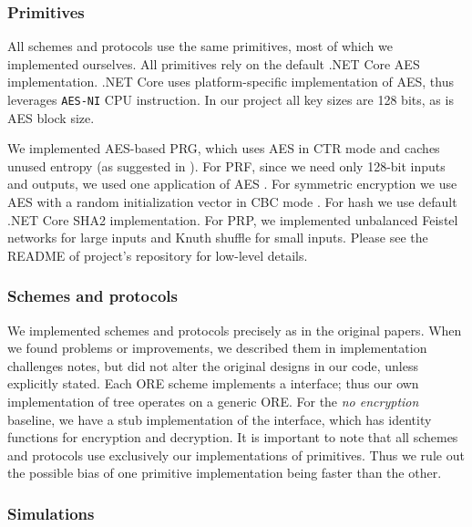 		\subsubsection{Primitives}

			All schemes and protocols use the same primitives, most of which we implemented ourselves.
			All primitives rely on the default {.NET Core} AES implementation.
			{.NET Core} uses platform-specific implementation of AES, thus leverages \texttt{AES-NI} CPU instruction.
			In our project all key sizes are 128 bits, as is AES block size.

			We implemented AES-based PRG, which uses AES in CTR mode and caches unused entropy (as suggested in \cite{aes-ctr-rfc}).
			For PRF, since we need only 128-bit inputs and outputs, we used one application of AES \cite[Proposition 3.27]{intro-to-modern-crypto}.
			For symmetric encryption we use AES with a random initialization vector in CBC mode \cite[Section 3.6.2]{intro-to-modern-crypto}.
			For hash we use default {.NET Core} SHA2 implementation.
			For PRP, we implemented unbalanced Feistel networks \cite{unbalanced-feistel} for large inputs and Knuth shuffle \cite{knuth-shuffle} for small inputs.
			Please see the README of project's repository \cite{ore-project} for low-level details.

		\subsubsection{Schemes and protocols}

			We implemented schemes and protocols precisely as in the original papers.
			When we found problems or improvements, we described them in implementation challenges notes, but did not alter the original designs in our code, unless explicitly stated.
			Each ORE scheme implements a {\Csharp} interface; thus our own implementation of {\BPlus} tree operates on a generic ORE\@.
			For the \emph{no encryption} baseline, we have a stub implementation of the interface, which has identity functions for encryption and decryption.
			It is important to note that all schemes and protocols use exclusively our implementations of primitives.
			Thus we rule out the possible bias of one primitive implementation being faster than the other.

			

		\subsubsection{Simulations}

